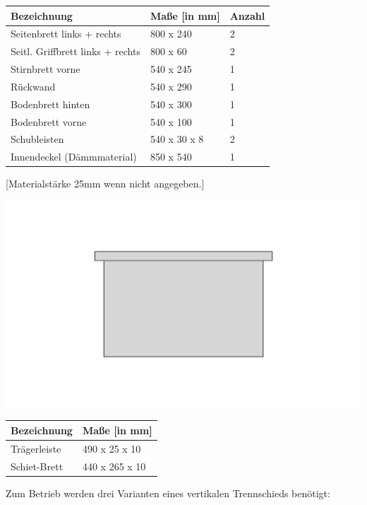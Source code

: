\documentclass[12pt,a4paper,ngerman]{scrartcl}
\begin{document}

\begin{center}
\begin{tabular}{lll}
  Bezeichnung &                       Maße [in mm] &          Anzahl \\
  \hline
  Seitenbrett links + rechts &        800 x 240 &             2 \\
  Seitl. Griffbrett links + rechts &  800 x 60 &              2 \\
  Stirnbrett vorne &                  540 x 245 &             1 \\
  Rückwand &                          540 x 290 &             1 \\
  Bodenbrett hinten &                 540 x 300 &             1 \\
  Bodenbrett vorne &                  540 x 100 &             1 \\
  Schubleisten &                      540 x 30 x 8 &          2 \\
  \hline
  Innendeckel (Dämmmaterial) &        850 x 540 &             1 \\
  \hline
\end{tabular}

[Materialstärke 25mm wenn nicht angegeben.]
\end{center}



\begin{center}
\includegraphics[width=.5\textwidth]{schiet}

\begin{tabular}{ll}
  Bezeichnung &                       Maße [in mm] \\
  \hline
  Trägerleiste &                      490 x 25 x 10 \\
  Schiet-Brett &                      440 x 265 x 10 \\
  \hline
\end{tabular}
\end{center}


Zum Betrieb werden drei Varianten eines vertikalen Trennschieds benötigt:
\end{document}
